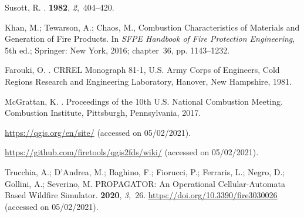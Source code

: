 \documentclass[atmosphere,article,accept,moreauthors,pdftex]{Definitions/mdpi}
\begin{document}
\begin{thebibliography}{999}
Susott, R.
.
 {\bf 1982}, {\em 2},~404--420.

Khan, M.; Tewarson, A.; Chaos, M., {Combustion Characteristics of Materials and
  Generation of Fire Products}.
\newblock In {\em SFPE Handbook of Fire Protection Engineering}, 5th ed.;
  Springer: New York,  2016; chapter~36, pp. 1143--1232.

Farouki, O.
.
\newblock CRREL Monograph 81-1, U.S. Army Corps of Engineers, Cold Regions
  Research and Engineering Laboratory, Hanover, New Hampshire,  1981.

McGrattan, K.
.
\newblock  Proceedings of the 10th U.S. National Combustion Meeting. Combustion
  Institute, Pittsburgh, Pennsylvania,  2017.

\href{https://qgis.org/en/site/}{https://qgis.org/en/site/} (accessed on 05/02/2021).

\href{https://github.com/firetools/qgis2fds/wiki/}{https://github.com/firetools/qgis2fds/wiki/} (accessed on 05/02/2021).

Trucchia, A.; D’Andrea, M.; Baghino, F.; Fiorucci, P.; Ferraris, L.; Negro,
  D.; Gollini, A.; Severino, M.
\newblock PROPAGATOR: An Operational Cellular-Automata Based Wildfire
  Simulator.
 {\bf 2020}, {\em 3},~26.
\newblock
  \href{https://doi.org/10.3390/fire3030026}{https://doi.org/10.3390/fire3030026} (accessed on 05/02/2021).

\end{thebibliography}
\end{document}
